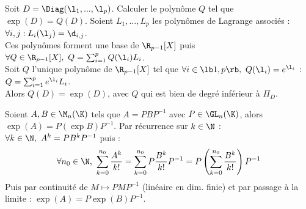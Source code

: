 \documentclass[11pt]{article}
\begin{document}
\begin{ex}{}{}
    Soit $D=\Diag(\l_1,...,\l_p)$. Calculer le polynôme $Q$ tel que $\exp(D)=Q(D)$.
    \tcblower
    Soient $L_1,...,L_p$ les polynômes de Lagrange associés : $\forall i,j : L_i(\l_j)=\d_{i,j}$.\\
    Ces polynômes forment une base de $\R_{p-1}[X]$ puis $\forall Q \in \R_{p-1}[X], ~ Q = \sum_{i=1}^pQ(\l_i)L_i$.\\
    Soit $Q$ l'unique polynôme de $\R_{p-1}[X]$ tel que $\forall i \in \lb1,p\rb, ~ Q(\l_i)=e^{\l_i}$ : $Q=\sum_{i=1}^pe^{\l_i}L_i$.\\
    Alors $Q(D)=\exp(D)$, avec $Q$ qui est bien de degré inférieur à $\Pi_D$.
\end{ex}

\vspace*{-0.8cm}

\begin{prop}{}{}
    Soient $A,B\in\M_n(\K)$ tels que $A=PBP^{-1}$ avec $P\in\GL_n(\K)$, alors $\exp(A)=P(\exp B)P^{-1}$.
    \tcblower
    Par récurrence sur $k\in\N$ : $\forall k \in \N, ~ A^k = PB^kP^{-1}$ puis :
    \begin{equation*}
        \forall n_0 \in \N, ~ \sum_{k=0}^{n_0} \frac{A^k}{k!} = \sum_{k=0}^{n_0}P\frac{B^k}{k!}P^{-1} = P\left( \sum_{k=0}^{n_0}\frac{B^k}{k!} \right)P^{-1}
    \end{equation*}
    Puis par continuité de $M\mapsto PMP^{-1}$ (linéaire en dim. finie) et par passage à la limite : $\exp(A)=P\exp(B)P^{-1}$.
\end{prop}

\vspace*{-0.8cm}
\end{document}
